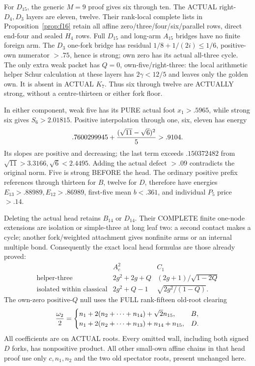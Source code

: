 \documentclass[11pt]{article}
\begin{document}
For \(D_{15}\), the generic \(M=9\)
proof gives six through ten.
The ACTUAL right-\(D_4,D_3\) layers are
eleven, twelve.
Their rank-local complete lists in
Proposition~\ref{prop:f16} retain all affine
zero/three/four/six/parallel rows, direct
end-four and sealed \(H_4\) rows.
Full \(D_{15}\) and long-arm \(A_{15}\)
bridges have no finite foreign arm.
The \(D_3\) one-fork bridge has residual
\(1/8+1/(2i)\le1/6\), positive-own
numerator \(>.75\), hence is strong;
own zero has its actual all-three cycle.
The only extra weak packet has \(Q=0\),
own-five/right-three: the local arithmetic
helper Schur calculation at these layers
has \(2\gamma<12/5\) and leaves only
the golden own.
It is absent in ACTUAL \(K_7\).
Thus six through twelve are ACTUALLY
strong, without a centre-thirteen or
either fork floor.

In either component, weak five has its
PURE actual foot \(x_1>.5965\), while
strong six gives \(S_6>2.01815\).
Positive interpolation through one,
six, eleven has energy
\[
          .7600299945+{(\sqrt{11}-\sqrt6)^2\over5}>.9104 .
\]
Its slopes are positive and decreasing;
the last term exceeds \(.150372482\)
from \(\sqrt{11}>3.3166,\sqrt6<2.4495\).
Adding the actual defect \(>.09\)
contradicts the original norm.
Five is strong BEFORE the head.
The ordinary positive prefix references
through thirteen for \(B\), twelve for
\(D\), therefore have energies
\(E_{13}>.88989,E_{12}>.86989\), first-five
mean \(b<.361\), and individual
\(P_5\) price \(>.14\).

Deleting the actual head retains \(B_{14}\)
or \(D_{14}\).
Their COMPLETE finite one-node extensions
are isolation or simple-three at long
leaf two: a second contact makes a cycle;
another fork/weighted attachment gives
nonfinite arms or an internal multiple bond.
Consequently the exact local head formulas
are those already proved:
\[
 \begin{array}{c|c|c}
 &A_c^2&C_1\\ \hline
 \text{helper-three}&2g^2+2g+Q&(2g+1)/\sqrt{1-2Q}\\
 \text{isolated within classical}&2g^2+Q-1&
                                    \sqrt{2g^2/(1-Q)} .
 \end{array}
\]
The own-zero positive-\(Q\) null uses the
FULL rank-fifteen old-root clearing
\[
 {\omega_2\over2}=
 \begin{cases}
 n_1+2(n_2+\cdots+n_{14})+\sqrt2n_{15},&B,\\
 n_1+2(n_2+\cdots+n_{13})+n_{14}+n_{15},&D .
 \end{cases}
\]
All coefficients are on ACTUAL roots.
Every omitted wall, including both signed
\(D\) forks, has nonpositive product.
All other small-own affine chains in
that head proof use only \(c,n_1,n_2\)
and the two old spectator roots, present
unchanged here.
\end{document}

